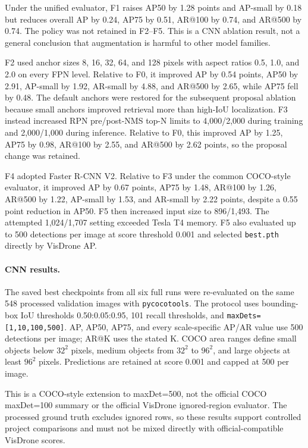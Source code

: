 Under the unified evaluator, F1 raises AP50 by 1.28 points and AP-small by 0.18
but reduces overall AP by 0.24, AP75 by 0.51, AR@100 by 0.74, and AR@500 by
0.74. The policy was not retained in F2--F5. This is a CNN ablation result, not
a general conclusion that augmentation is harmful to other model families.

F2 used anchor sizes 8, 16, 32, 64, and 128 pixels with aspect ratios 0.5,
1.0, and 2.0 on every FPN level. Relative to F0, it improved AP by 0.54 points,
AP50 by 2.91, AP-small by 1.92, AR-small by 4.88, and AR@500 by 2.65, while
AP75 fell by 0.48. The default anchors were restored for the subsequent
proposal ablation because small anchors improved retrieval more than high-IoU
localization. F3 instead increased RPN pre/post-NMS top-N limits to
4,000/2,000 during training and 2,000/1,000 during inference. Relative to F0,
this improved AP by 1.25, AP75 by 0.98, AR@100 by 2.55, and AR@500 by 2.62
points, so the proposal change was retained.

F4 adopted Faster R-CNN V2. Relative to F3 under the common COCO-style
evaluator, it improved AP by 0.67 points, AP75 by 1.48, AR@100 by 1.26,
AR@500 by 1.22, AP-small by 1.53, and AR-small by 2.22 points, despite a 0.55
point reduction in AP50. F5 then increased input size to 896/1,493.
The attempted 1,024/1,707 setting exceeded Tesla T4 memory. F5 also evaluated
up to 500 detections per image at score threshold 0.001 and selected
\texttt{best.pth} directly by VisDrone AP.

\paragraph{CNN results.}
The saved best checkpoints from all six full runs were re-evaluated on the
same 548 processed validation images with \texttt{pycocotools}. The protocol
uses bounding-box IoU thresholds 0.50:0.05:0.95, 101 recall thresholds, and
\texttt{maxDets=[1,10,100,500]}. AP, AP50, AP75, and every scale-specific
AP/AR value use 500 detections per image; AR@K uses the stated K. COCO area
ranges define small objects below $32^2$ pixels, medium objects from $32^2$ to
$96^2$, and large objects at least $96^2$ pixels. Predictions are retained at
score 0.001 and capped at 500 per image.

This is a COCO-style extension to maxDet=500, not the official COCO maxDet=100
summary or the official VisDrone ignored-region evaluator. The processed
ground truth excludes ignored rows, so these results support controlled project
comparisons and must not be mixed directly with official-compatible VisDrone
scores.

